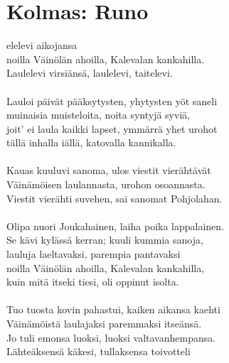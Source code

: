 
\chapter*{Kolmas: Runo}

 elelevi aikojansa           \\
noilla Väinölän ahoilla, Kalevalan kankahilla.                \\
Laulelevi virsiänsä, laulelevi, taitelevi.                    \\
                                                              \\
Lauloi päivät pääksytysten, yhytysten yöt saneli              \\
muinaisia muisteloita, noita syntyjä syviä,                   \\
joit' ei laula kaikki lapset, ymmärrä yhet urohot             \\
tällä inhalla iällä, katovalla kannikalla.                    \\
                                                              \\
Kauas kuuluvi sanoma, ulos viestit vierähtävät                \\
Väinämöisen laulannasta, urohon osoannasta.                   \\
Viestit vierähti suvehen, sai sanomat Pohjolahan.             \\
                                                              \\
Olipa nuori Joukahainen, laiha poika lappalainen.             \\
Se kävi kylässä kerran; kuuli kummia sanoja,                  \\
lauluja laeltavaksi, parempia pantavaksi                      \\
noilla Väinölän ahoilla, Kalevalan kankahilla,                \\
kuin mitä itseki tiesi, oli oppinut isolta.                   \\
                                                              \\
Tuo tuosta kovin pahastui, kaiken aikansa kaehti              \\
Väinämöistä laulajaksi paremmaksi itseänsä.                   \\
Jo tuli emonsa luoksi, luoksi valtavanhempansa.               \\
Lähteäksensä käkesi, tullaksensa toivotteli                   \\
